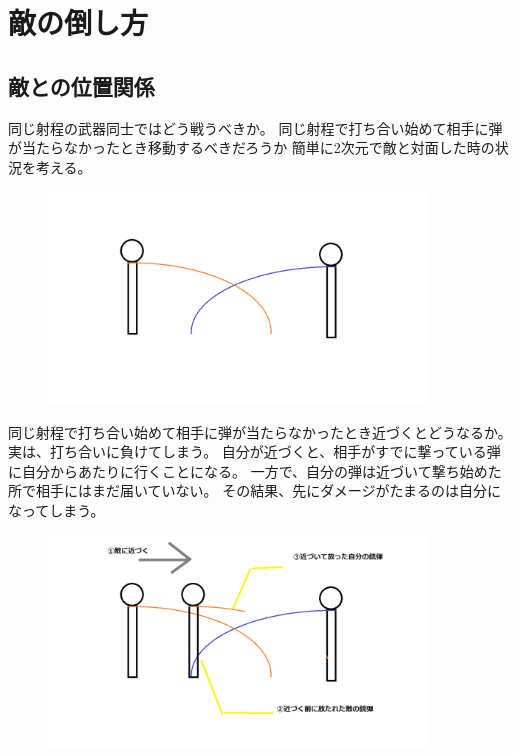 \documentclass[a4paper,11pt]{jsbook}
\begin{document}
\section{敵の倒し方}
\subsection{敵との位置関係}
同じ射程の武器同士ではどう戦うべきか。
同じ射程で打ち合い始めて相手に弾が当たらなかったとき移動するべきだろうか
簡単に2次元で敵と対面した時の状況を考える。
\begin{figure}[h]
  \begin{center}
    \includegraphics[width=10cm]{resoource/samerange.png}
  \end{center}
\end{figure}

同じ射程で打ち合い始めて相手に弾が当たらなかったとき近づくとどうなるか。
実は、打ち合いに負けてしまう。
自分が近づくと、相手がすでに撃っている弾に自分からあたりに行くことになる。
一方で、自分の弾は近づいて撃ち始めた所で相手にはまだ届いていない。
その結果、先にダメージがたまるのは自分になってしまう。
\begin{figure}[h]
  \begin{center}
    \includegraphics[width=10cm]{resoource/samerange_attacking.png}
  \end{center}
\end{figure}
\end{document}
